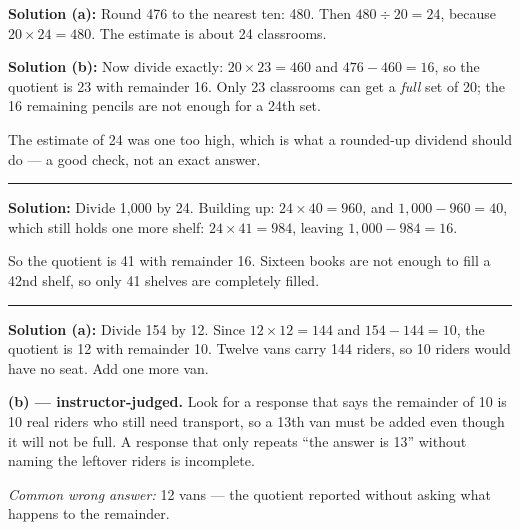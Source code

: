 \documentclass[12pt]{article}
\begin{document}
\textbf{Solution (a):} Round 476 to the nearest ten: 480. Then $480 \div 20 = 24$, because $20 \times 24 = 480$. The estimate is about 24 classrooms. 

\textbf{Solution (b):} Now divide exactly: $20 \times 23 = 460$ and $476 - 460 = 16$, so the quotient is 23 with remainder 16. Only 23 classrooms can get a \emph{full} set of 20; the 16 remaining pencils are not enough for a 24th set. 

The estimate of 24 was one too high, which is what a rounded-up dividend should do --- a good check, not an exact answer.

\vspace{0.2cm}\noindent\rule{\linewidth}{0.2pt}\vspace{0.2cm}


\textbf{Solution:} Divide 1{,}000 by 24. Building up: $24 \times 40 = 960$, and $1{,}000 - 960 = 40$, which still holds one more shelf: $24 \times 41 = 984$, leaving $1{,}000 - 984 = 16$.

So the quotient is 41 with remainder 16. Sixteen books are not enough to fill a 42nd shelf, so only 41 shelves are completely filled. 

\vspace{0.2cm}\noindent\rule{\linewidth}{0.2pt}\vspace{0.2cm}


\textbf{Solution (a):} Divide 154 by 12. Since $12 \times 12 = 144$ and $154 - 144 = 10$, the quotient is 12 with remainder 10. Twelve vans carry 144 riders, so 10 riders would have no seat. Add one more van. 

\textbf{(b) --- instructor-judged.} Look for a response that says the remainder of 10 is 10 real riders who still need transport, so a 13th van must be added even though it will not be full. A response that only repeats ``the answer is 13'' without naming the leftover riders is incomplete.

\emph{Common wrong answer:} 12 vans --- the quotient reported without asking what happens to the remainder.
\end{document}
